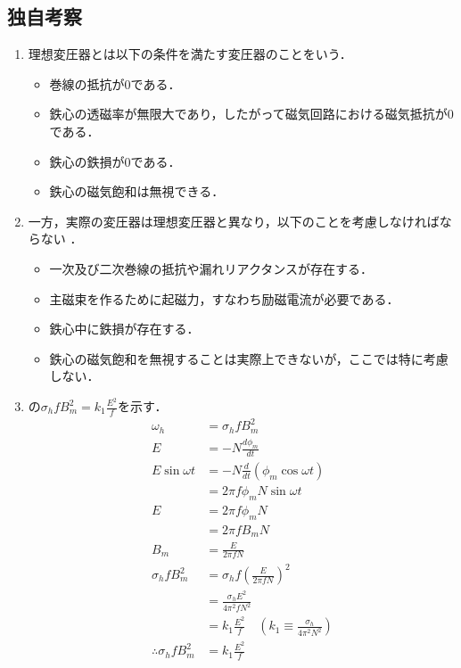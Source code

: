 \newpage
\subsection{独自考察}
\begin{enumerate}[1.]
	\item 理想変圧器とは以下の条件を満たす変圧器のことをいう\cite{1130000795154912128}．
\begin{itemize}
	\item 巻線の抵抗が0である．
	\item 鉄心の透磁率が無限大であり，したがって磁気回路における磁気抵抗が0である．
	\item 鉄心の鉄損が0である．
	\item 鉄心の磁気飽和は無視できる．
\end{itemize}
\item 一方，実際の変圧器は理想変圧器と異なり，以下のことを考慮しなければならない
\label{real}
\cite{1130154912128}．
\begin{itemize}
	\item 一次及び二次巻線の抵抗や漏れリアクタンスが存在する．
	\item 主磁束を作るために起磁力，すなわち励磁電流が必要である．
	\item 鉄心中に鉄損が存在する．
	\item 鉄心の磁気飽和を無視することは実際上できないが，ここでは特に考慮しない．
\end{itemize}
\item {}の$\sigma_{h}fB_{m}^{2}=k_{1}\frac{E^{2}}{f}$を示す．
\begin{align*}
	\omega_{h}&=\sigma_{h}fB_{m}^{2}\\
	E&=-N\frac{d\phi_{m}}{d t}\\
	E\sin \omega t&=-N\frac{d}{dt}(\phi_{m} \cos \omega t)\\ 
	&=2\pi f \phi_{m} N\sin \omega t\\
	E&=2\pi f \phi_{m} N\\
	&=2\pi f B_{m} N\\
	B_{m}&=\frac{E}{2\pi f N}\tag{*}\\
	\sigma_{h}fB_{m}^{2}&=\sigma_{h}f\left(\frac{E}{2\pi f N}\right)^{2}\\
	&=\frac{\sigma_{h}E^{2}}{4\pi^{2} f N^{2}}\\
	&=k_{1}\frac{E^{2}}{f}\quad \left(k_{1}\equiv\frac{\sigma_{h}}{4\pi^{2}N^{2}}\right)\\
	\therefore \sigma_{h}fB_{m}^{2}&=k_{1}\frac{E^{2}}{f}
\end{align*}

\end{enumerate}
